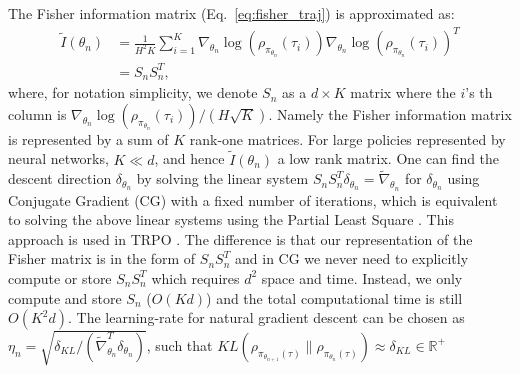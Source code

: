 \documentclass{article}
\newcommand{\wen}[1]{\textcolor{green}{\bf Wen: {#1}}}
\begin{document}
The Fisher information matrix (Eq.~\ref{eq:fisher_traj}) is approximated as:
\begin{align}
\tilde{I}(\theta_n) &= \frac{1}{H^2K}\sum_{i=1}^K \nabla_{\theta_n}\log(\rho_{\pi_{\theta_n}}(\tau_i))\nabla_{\theta_n}\log(\rho_{\pi_{\theta_n}}(\tau_i))^T \nonumber\\
& = S_n S_n^T,
\end{align} where, for notation simplicity, we denote $S_n$ as a $d\times K$ matrix where the $i$'s th column is $\nabla_{\theta_n}\log(\rho_{\pi_{\theta_n}}(\tau_i))/(H\sqrt{K})$. Namely the Fisher information matrix is represented by a sum of $K$ rank-one matrices. For large policies represented by neural networks, $K\ll d$, and hence  $\tilde{I}(\theta_n)$ a low rank matrix. %
One can find the descent direction $\delta_{\theta_n}$ by solving the linear system $S_nS_n^T \delta_{\theta_n} = \tilde{\nabla}_{\theta_n}$ for $\delta_{\theta_n}$ using Conjugate Gradient (CG) with a fixed number of iterations, which is equivalent to solving the above linear systems using the Partial Least Square \cite{phatak2002exploiting}. This approach is used in TRPO \cite{schulman2015trust}. The difference is that our representation of the Fisher matrix is in the form of $S_nS_n^T$ and in CG we never need to explicitly compute or store $S_nS_n^T$ which requires $d^2$ space and time. Instead, we only compute and store $S_n$ ($O(Kd)$) and the total computational time is still $O(K^2 d)$. The learning-rate for natural gradient descent can be chosen as $\eta_n = \sqrt{\delta_{KL}/(\tilde{\nabla}_{\theta_n}^T\delta_{\theta_n})}$, such that $KL(\rho_{\pi_{\theta_{n+1}}(\tau)}\|\rho_{\pi_{\theta_{n}}(\tau)})\approx \delta_{KL}\in\mathbb{R}^+$
\end{document}
